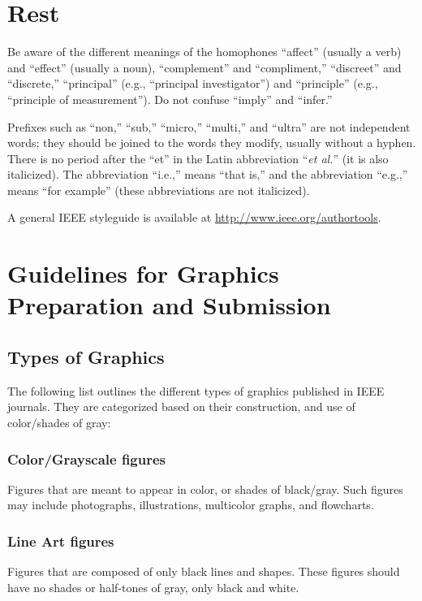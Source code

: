 \documentclass{IEEEtran}
\begin{document}
\section{Rest}

Be aware of the different meanings of the homophones ``affect'' (usually a 
verb) and ``effect'' (usually a noun), ``complement'' and ``compliment,'' 
``discreet'' and ``discrete,'' ``principal'' (e.g., ``principal 
investigator'') and ``principle'' (e.g., ``principle of measurement''). Do 
not confuse ``imply'' and ``infer.'' 

Prefixes such as ``non,'' ``sub,'' ``micro,'' ``multi,'' and ``ultra'' are 
not independent words; they should be joined to the words they modify, 
usually without a hyphen. There is no period after the ``et'' in the Latin 
abbreviation ``\emph{et al.}'' (it is also italicized). The abbreviation ``i.e.,'' means 
``that is,'' and the abbreviation ``e.g.,'' means ``for example'' (these 
abbreviations are not italicized).

A general IEEE styleguide is available at \underline{http://www.ieee.org/authortools}.

\section{Guidelines for Graphics Preparation and Submission}
\label{sec:guidelines}

\subsection{Types of Graphics}
The following list outlines the different types of graphics published in 
IEEE journals. They are categorized based on their construction, and use of 
color/shades of gray:

\subsubsection{Color/Grayscale figures}
{Figures that are meant to appear in color, or shades of black/gray. Such 
figures may include photographs, illustrations, multicolor graphs, and 
flowcharts.}

\subsubsection{Line Art figures}
{Figures that are composed of only black lines and shapes. These figures 
should have no shades or half-tones of gray, only black and white.}
\end{document}
